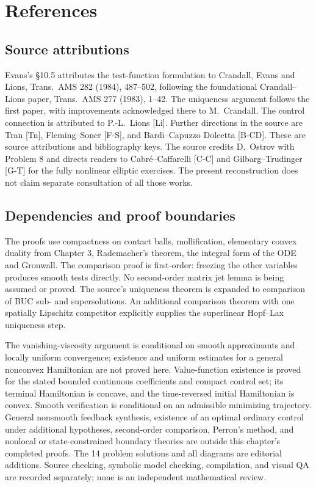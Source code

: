 \clearpage
\section{References}
\label{sec:10-5}
\subsection*{Source attributions}
Evans's \S10.5 attributes the test-function formulation to Crandall,
Evans and Lions, Trans.~AMS 282 (1984), 487--502, following the
foundational Crandall--Lions paper, Trans.~AMS 277 (1983), 1--42.
The uniqueness argument follows the first paper, with improvements
acknowledged there to M.~Crandall. The control connection is attributed
to P.-L.~Lions [Li]. Further directions in the source are Tran [Tn],
Fleming--Soner [F-S], and Bardi--Capuzzo Dolcetta [B-CD]. These are
source attributions and bibliography keys. The source credits D.~Ostrov
with Problem 8 and directs readers to Cabr\'e--Caffarelli [C-C] and
Gilbarg--Trudinger [G-T] for the fully nonlinear elliptic exercises.
The present reconstruction
does not claim separate consultation of all those works.

\subsection*{Dependencies and proof boundaries}
The proofs use compactness on contact balls, mollification, elementary
convex duality from Chapter 3, Rademacher's theorem, the integral form
of the ODE and Gronwall. The comparison proof is first-order: freezing
the other variables produces smooth tests directly. No second-order
matrix jet lemma is being assumed or proved. The source's uniqueness
theorem is expanded to comparison of BUC sub- and supersolutions.
An additional comparison theorem with one spatially Lipschitz competitor
explicitly supplies the superlinear Hopf--Lax uniqueness step.

The vanishing-viscosity argument is conditional on smooth approximants
and locally uniform convergence; existence and uniform estimates for a
general nonconvex Hamiltonian are not proved here. Value-function existence
is proved for the stated bounded continuous coefficients and compact
control set; its terminal Hamiltonian is concave, and the time-reversed
initial Hamiltonian is convex. Smooth verification is conditional on an
admissible minimizing trajectory. General nonsmooth feedback synthesis,
existence of an optimal ordinary control under additional hypotheses,
second-order comparison, Perron's method, and nonlocal or state-constrained
boundary theories are outside this chapter's completed proofs.
The 14 problem solutions and all diagrams are editorial additions.
Source checking, symbolic model checking, compilation, and visual QA are
recorded separately; none is an independent mathematical review.
